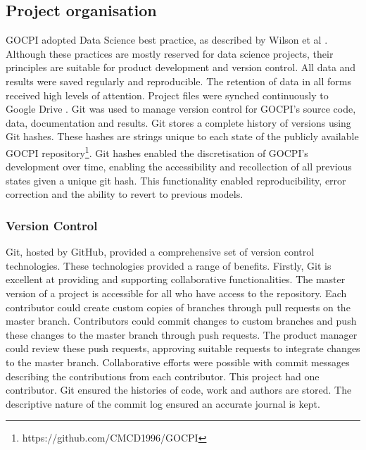 \documentclass[12pt]{article}
\begin{document}
\subsection{Project organisation}
GOCPI adopted Data Science best practice, as described by Wilson et al \cite{J:10}. Although these practices are
mostly reserved for data science projects, their principles are suitable for product development and version control. All data and
results were saved regularly and reproducible. The retention of data in all forms received high levels of attention. Project files were synched
continuously to Google Drive \cite{Google_Drive}. Git \cite{Git} was used to manage version control for GOCPI's source code, data, documentation and results.
Git stores a complete history of versions using Git hashes. These hashes are strings unique to each state of the
publicly available GOCPI repository\footnote[1]{https://github.com/CMCD1996/GOCPI}. Git hashes enabled the discretisation of GOCPI's development over time,
enabling the accessibility and recollection of all previous states given a unique git hash. This functionality
enabled reproducibility, error correction and the ability to revert to previous models.

\subsubsection{Version Control}\label{Version Control}
Git, hosted by GitHub, provided a comprehensive set of version control technologies. These technologies provided a range of benefits.
Firstly, Git is excellent at providing and supporting collaborative functionalities. The master version of a project is accessible for all
who have access to the repository. Each contributor could create custom copies of branches through pull requests on the master branch. Contributors
could commit changes to custom branches and push these changes to the master branch through push requests. The product manager could review these push requests,
approving suitable requests to integrate changes to the master branch. Collaborative efforts were possible with
commit messages describing the contributions from each contributor. This project had one contributor. Git ensured the histories of code, work and authors are stored.
The descriptive nature of the commit log ensured an accurate journal is kept.
\end{document}
